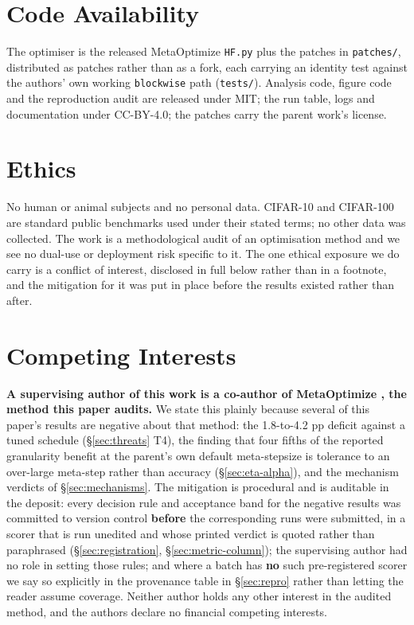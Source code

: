 \documentclass[10pt,letterpaper]{article}
\newcommand{\arm}[1]{\texttt{#1}}
\begin{document}
\section*{Code Availability}
The optimiser is the released MetaOptimize \texttt{HF.py} plus the patches in \texttt{patches/},
distributed as patches rather than as a fork, each carrying an identity test against the authors'
own working \arm{blockwise} path (\texttt{tests/}). Analysis code, figure code and the reproduction
audit are released under MIT; the run table, logs and documentation under CC-BY-4.0; the patches
carry the parent work's license.

\section*{Ethics}
No human or animal subjects and no personal data. CIFAR-10 and CIFAR-100 are standard public
benchmarks used under their stated terms; no other data was collected. The work is a methodological
audit of an optimisation method and we see no dual-use or deployment risk specific to it. The one
ethical exposure we do carry is a conflict of interest, disclosed in full below rather than in a
footnote, and the mitigation for it was put in place before the results existed rather than after.

\section*{Competing Interests}
\textbf{A supervising author of this work is a co-author of MetaOptimize
\citep{sharifnassab2025metaoptimize}, the method this paper audits.} We state this plainly because
several of this paper's results are negative about that method: the 1.8-to-4.2 pp deficit against a
tuned schedule (\S\ref{sec:threats} T4), the finding that four fifths of the reported granularity
benefit at the parent's own default meta-stepsize is tolerance to an over-large meta-step rather
than accuracy (\S\ref{sec:eta-alpha}), and the mechanism verdicts of \S\ref{sec:mechanisms}. The
mitigation is procedural and is auditable in the deposit: every decision rule and acceptance band
for the negative results was committed to version control \textbf{before} the corresponding runs
were submitted, in a scorer that is run unedited and whose printed verdict is quoted rather than
paraphrased (\S\ref{sec:registration}, \S\ref{sec:metric-column}); the supervising author had no
role in setting those rules; and where a batch has \textbf{no} such pre-registered scorer we say so
explicitly in the provenance table in \S\ref{sec:repro} rather than letting the reader assume
coverage. Neither author holds any other interest in the audited method, and the authors declare no
financial competing interests.
\end{document}
